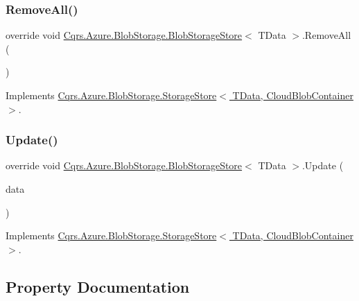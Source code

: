 \subsubsection{\texorpdfstring{Remove\+All()}{RemoveAll()}}
{\footnotesize\ttfamily override void \hyperlink{classCqrs_1_1Azure_1_1BlobStorage_1_1BlobStorageStore}{Cqrs.\+Azure.\+Blob\+Storage.\+Blob\+Storage\+Store}$<$ T\+Data $>$.Remove\+All (\begin{DoxyParamCaption}{ }\end{DoxyParamCaption})\hspace{0.3cm}{\ttfamily [virtual]}}



Implements \hyperlink{classCqrs_1_1Azure_1_1BlobStorage_1_1StorageStore_a4e848f342be903293812b3b660464d1a}{Cqrs.\+Azure.\+Blob\+Storage.\+Storage\+Store$<$ T\+Data, Cloud\+Blob\+Container $>$}.

\mbox{\label{classCqrs_1_1Azure_1_1BlobStorage_1_1BlobStorageStore_a03be976aded454866b4589de99a9e1c8}} 
\subsubsection{\texorpdfstring{Update()}{Update()}}
{\footnotesize\ttfamily override void \hyperlink{classCqrs_1_1Azure_1_1BlobStorage_1_1BlobStorageStore}{Cqrs.\+Azure.\+Blob\+Storage.\+Blob\+Storage\+Store}$<$ T\+Data $>$.Update (\begin{DoxyParamCaption}\item[{T\+Data}]{data }\end{DoxyParamCaption})\hspace{0.3cm}{\ttfamily [virtual]}}



Implements \hyperlink{classCqrs_1_1Azure_1_1BlobStorage_1_1StorageStore_ae9ca8bfe30040f77e349a4d47b31da70}{Cqrs.\+Azure.\+Blob\+Storage.\+Storage\+Store$<$ T\+Data, Cloud\+Blob\+Container $>$}.



\subsection{Property Documentation}
\mbox{\label{classCqrs_1_1Azure_1_1BlobStorage_1_1BlobStorageStore_af4f4ed2c32ce521ebf164e63ef453b9c}} 
